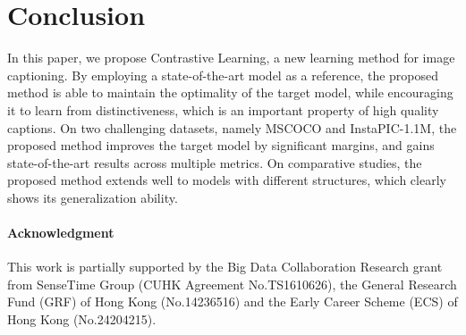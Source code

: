 \section{Conclusion}
\label{sec:concls}

In this paper, we propose Contrastive Learning,
a new learning method for image captioning.
By employing a state-of-the-art model as a reference,
the proposed method is able to maintain the optimality of the target model,
while encouraging it to learn from distinctiveness,
which is an important property of high quality captions.
On two challenging datasets, namely MSCOCO and InstaPIC-1.1M,
the proposed method improves the target model by significant margins,
and gains state-of-the-art results across multiple metrics.
On comparative studies,
the proposed method extends well to models with different structures,
which clearly shows its generalization ability.

\paragraph{Acknowledgment}
This work is partially supported by
the Big Data Collaboration Research grant from SenseTime Group (CUHK Agreement No.TS1610626), 
the General Research Fund (GRF) of Hong Kong (No.14236516)
and the Early Career Scheme (ECS) of Hong Kong (No.24204215).
